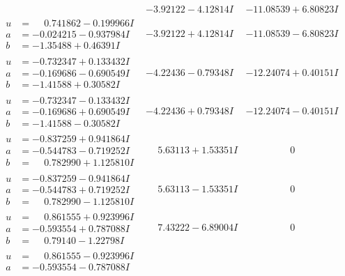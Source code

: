 \documentclass[1p]{elsarticle_modified}
\theoremstyle{definition}
\begin{document}
$$\begin{array}{c|c|c}
 & -3.92122 - 4.12814 I & -11.08539 + 6.80823 I \\ \hline\begin{aligned}
u &= \phantom{-}0.741862 - 0.199966 I \\
a &= -0.024215 - 0.937984 I \\
b &= -1.35488 + 0.46391 I\end{aligned}
 & -3.92122 + 4.12814 I & -11.08539 - 6.80823 I \\ \hline\begin{aligned}
u &= -0.732347 + 0.133432 I \\
a &= -0.169686 - 0.690549 I \\
b &= -1.41588 + 0.30582 I\end{aligned}
 & -4.22436 - 0.79348 I & -12.24074 + 0.40151 I \\ \hline\begin{aligned}
u &= -0.732347 - 0.133432 I \\
a &= -0.169686 + 0.690549 I \\
b &= -1.41588 - 0.30582 I\end{aligned}
 & -4.22436 + 0.79348 I & -12.24074 - 0.40151 I \\ \hline\begin{aligned}
u &= -0.837259 + 0.941864 I \\
a &= -0.544783 - 0.719252 I \\
b &= \phantom{-}0.782990 + 1.125810 I\end{aligned}
 & \phantom{-}5.63113 + 1.53351 I & \phantom{-0.000000 } 0 \\ \hline\begin{aligned}
u &= -0.837259 - 0.941864 I \\
a &= -0.544783 + 0.719252 I \\
b &= \phantom{-}0.782990 - 1.125810 I\end{aligned}
 & \phantom{-}5.63113 - 1.53351 I & \phantom{-0.000000 } 0 \\ \hline\begin{aligned}
u &= \phantom{-}0.861555 + 0.923996 I \\
a &= -0.593554 + 0.787088 I \\
b &= \phantom{-}0.79140 - 1.22798 I\end{aligned}
 & \phantom{-}7.43222 - 6.89004 I & \phantom{-0.000000 } 0 \\ \hline\begin{aligned}
u &= \phantom{-}0.861555 - 0.923996 I \\
a &= -0.593554 - 0.787088 I \\

\end{aligned}
\end{array}$$
\end{document}
